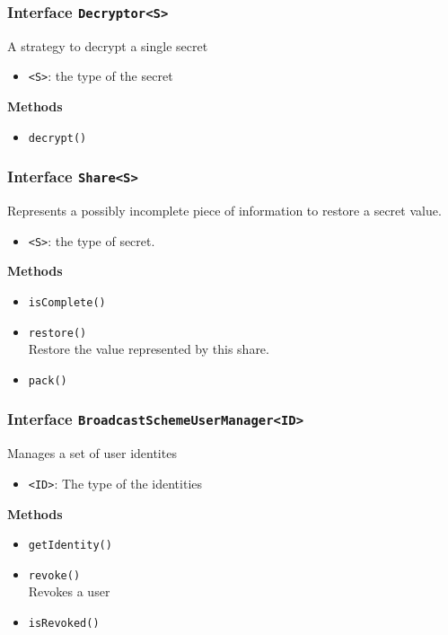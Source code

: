 \subsubsection{Interface \lstinline|Decryptor<S>|}
A strategy to decrypt a single secret
\begin{itemize}
\item \lstinline|<S>|: the type of the secret
\end{itemize}


\textbf{Methods}
\begin{itemize}
\item \lstinline|decrypt()| \\


\end{itemize}

\subsubsection{Interface \lstinline|Share<S>|}
Represents a possibly incomplete piece of information to restore a secret value.
\begin{itemize}
\item \lstinline|<S>|: the type of secret.
\end{itemize}


\textbf{Methods}
\begin{itemize}
\item \lstinline|isComplete()| \\


\item \lstinline|restore()| \\
Restore the value represented by this share.

\item \lstinline|pack()| \\


\end{itemize}

\subsubsection{Interface \lstinline|BroadcastSchemeUserManager<ID>|}
Manages a set of user identites
\begin{itemize}
\item \lstinline|<ID>|: The type of the identities
\end{itemize}


\textbf{Methods}
\begin{itemize}
\item \lstinline|getIdentity()| \\


\item \lstinline|revoke()| \\
Revokes a user

\item \lstinline|isRevoked()| \\


\end{itemize}


